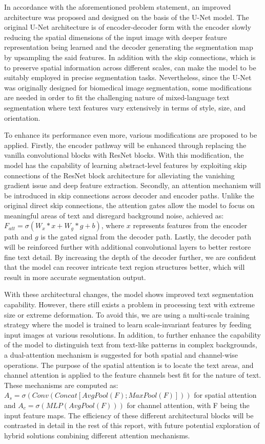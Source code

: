 \documentclass[10pt,twocolumn,letterpaper]{article}
\begin{document}
In accordance with the aforementioned problem statement, an improved architecture was proposed and designed on the basis of the U-Net model. 
The original U-Net architecture is of encoder-decoder form with the encoder slowly reducing the spatial dimensions of the input image with 
deeper feature representation being learned and the decoder generating the segmentation map by upsampling the said features. 
In addition with the skip connections, which is to preserve spatial information across different scales,  can make the model to be suitably
employed in precise segmentation tasks. Nevertheless, since the U-Net was originally designed for biomedical image segmentation, 
some modifications are needed in order to fit the challenging nature of mixed-language text segmentation where text features 
vary extensively in terms of style, size, and orientation.

To enhance its performance even more, various modifications are proposed to be applied. Firstly, the encoder pathway will be enhanced through replacing 
the vanilla convolutional blocks with ResNet blocks. With this modification, the model has the capability of learning abstract-level features 
by exploiting skip connections of the ResNet block architecture for alleviating the vanishing gradient issue and deep feature extraction. 
Secondly, an attention mechanism will be introduced in skip connections across decoder and encoder paths. Unlike the original direct skip connections, 
the attention gates allow the model to focus on meaningful areas of text and disregard background noise, 
achieved as: $F_{att} = \sigma(W_x * x + W_g * g + b)$, where $x$ represents features from the encoder path and $g$ is the gated signal from the decoder path. 
Lastly, the decoder path will be reinforced further with additional convolutional layers to better restore fine text detail. 
By increasing the depth of the decoder further, we are confident that the model can recover intricate text region structures better, 
which will result in more accurate segmentation output.

With these architectural changes, the model shows improved text segmentation capability. However, there still exists a problem 
in processing text with extreme size or extreme deformation. To avoid this, we are using a multi-scale training strategy where the model is trained 
to learn scale-invariant features by feeding input images at various resolutions. In addition, to further enhance the capability of the model 
to distinguish text from text-like patterns in complex backgrounds, a dual-attention mechanism is suggested for both spatial and channel-wise operations. 
The purpose of the spatial attention is to locate the text areas, and channel attention is applied to the feature channels best fit for the nature of text. 
These mechanisms are computed as: $A_s = \sigma(Conv(Concat[AvgPool(F); MaxPool(F)]))$ for spatial attention and $A_c = \sigma(MLP(AvgPool(F)))$ 
for channel attention, with F being the input feature maps. The efficiency of these different architectural blocks will be contrasted 
in detail in the rest of this report, with future potential exploration of hybrid solutions combining different attention mechanisms.
\end{document}
